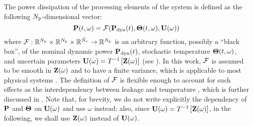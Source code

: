 The power dissipation of the processing elements of the system is defined as the following ${N_\text{p}}$-dimensional vector:
\begin{equation} \elabel{power-model}
  \vP(\t, \o) = \f(\vP_\dyn(\t), \vTO(\t, \o), \vU(\o))
\end{equation}
where $\mathcal{F}: \mathbb{R}^{N_\text{p}} \times \mathbb{R}^{N_\text{p}} \times \mathbb{R}^{\tilde{N}_\text{v}} \to \mathbb{R}^{N_\text{p}}$ is an arbitrary function, possibly a ``black box'', of the nominal dynamic power $\mathbf{P}_{\text{dyn}}(t)$, stochastic temperature ${\boldsymbol\Theta}(t, \omega)$, and uncertain parameters $\mathbf{U}(\omega) = T^{-1}\left[\mathbf{Z}(\omega)\right]$ (see ). In this work, $\mathcal{F}$ is assumed to be smooth in $\mathbf{Z}(\omega)$ and to have a finite variance, which is applicable to most physical systems \cite{xiu2002}. The definition of $\mathcal{F}$ is flexible enough to account for such effects as the interdependency between leakage and temperature \cite{srivastava2010, liu2007}, which is further discussed in . Note that, for brevity, we do not write explicitly the dependency of $\mathbf{P}$ and ${\boldsymbol\Theta}$ on $\mathbf{U}(\omega)$ and use $\omega$ instead; also, since $\mathbf{U}(\omega) = T^{-1}\left[\mathbf{Z}(\omega)\right]$, in the following, we shall use $\mathbf{Z}(\omega)$ instead of $\mathbf{U}(\omega)$.
